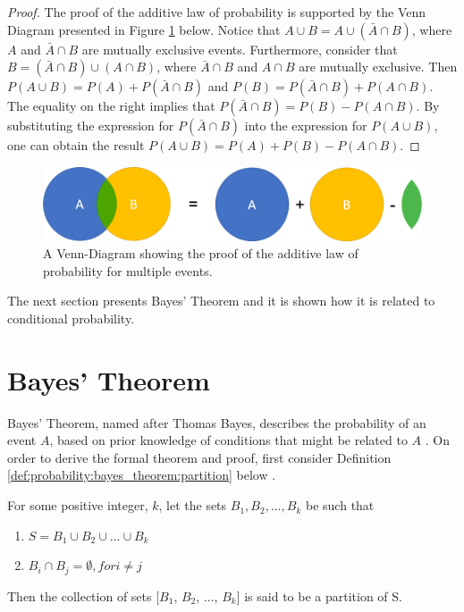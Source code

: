 \begin{proof}
    The proof of the additive law of probability is supported by the Venn Diagram presented in Figure \ref{fig:probability:multiple_events:additive} below. Notice that $A \cup B = A \cup ( \bar{A} \cap B)$, where $A$ and $\bar{A} \cap B$ are mutually exclusive events. Furthermore, consider that $B = (\bar{A} \cap B) \cup (A \cap B)$, where $\bar{A} \cap B$ and $A \cap B$ are mutually exclusive. Then $P(A \cup B) = P(A) + P(\bar{A} \cap B)$ and $P(B) = P(\bar{A} \cap B) + P(A \cap B)$. The equality on the right implies that $P(\bar{A} \cap B) = P(B) - P(A \cap B)$. By substituting the expression for $P(\bar{A} \cap B)$ into the expression for $P(A \cup B)$, one can obtain the result $P(A \cup B) = P(A) + P(B) - P(A \cap B)$.
\end{proof}

\begin{figure}[htbp]
    \includegraphics[width=\textwidth]{images/additive_law_of_probability_proof.png}
    \caption{A Venn-Diagram showing the proof of the additive law of probability for multiple events.}
    \label{fig:probability:multiple_events:additive}
\end{figure}

The next section presents Bayes' Theorem and it is shown how it is related to conditional probability.

\section{Bayes' Theorem}
\label{sec:probability:bayes_theorem}

Bayes' Theorem, named after Thomas Bayes, describes the probability of an event $A$, based on prior knowledge of conditions that might be related to $A$ \cite{ref:zalta:2015}. On order to derive the formal theorem and proof, first consider Definition \ref{def:probability:bayes_theorem:partition} below \cite{ref:zalta:2015}.

\begin{definition}
    \label{def:probability:bayes_theorem:partition}
    For some positive integer, $k$, let the sets $B_{1}, B_{2}, \dots, B_{k}$ be such that
    
    \begin{enumerate}
        \item $S = B_{1} \cup B_{2} \cup \dots \cup B_{k}$
        \item $B_{i} \cap B_{j} = \emptyset, for i \neq j$
    \end{enumerate}
    
    Then the collection of sets [$B_{1}$, $B_{2}$, $\dots$, $B_{k}$] is said to be a partition of S. 
\end{definition}

